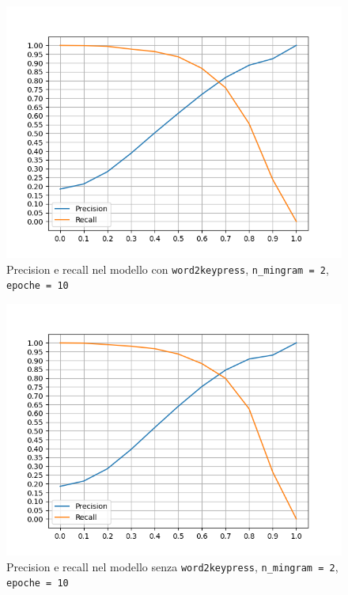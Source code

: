 \begin{figure}[H]
    \centering
    \includegraphics[width=14cm]{./immagini/CORRETTO_w2kp_nmingram=2_epochs=10.png}
    \caption{Precision e recall nel modello con \texttt{word2keypress}, \texttt{n\_mingram = 2}, \texttt{epoche = 10}}
    \label{terzomodello}
\end{figure}

\begin{figure}[H]
    \centering
    \includegraphics[width=14cm]{./immagini/no_w2kp_nmingram=2_epochs=10.png}
    \caption{Precision e recall nel modello senza \texttt{word2keypress}, \texttt{n\_mingram = 2}, \texttt{epoche = 10}}
    \label{quartomodello}
\end{figure}

